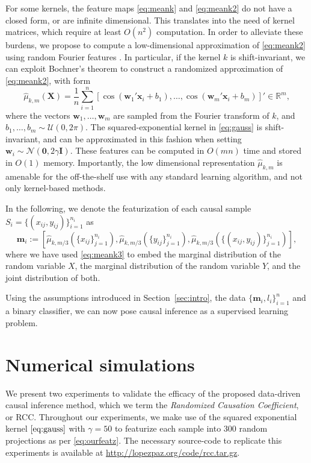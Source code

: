 \documentclass[twoside,11pt,a4paper]{article}
\begin{document}
For some kernels, the feature maps \eqref{eq:meank} and \eqref{eq:meank2} do
not have a closed form, or are infinite dimensional. This translates into the
need of kernel matrices, which require at least $O(n^2)$ computation. In order
to alleviate these burdens, we propose to compute a low-dimensional
approximation of \eqref{eq:meank2} using random Fourier features
\citep{Rahimi07}. In particular, if the kernel $k$ is shift-invariant, we can
exploit Bochner's theorem \citep{Rudin62} to construct a randomized
approximation of \eqref{eq:meank2}, with form
\begin{equation}\label{eq:meank3}
  \hat{\mu}_{k,m}(\bm X) = \frac{1}{n} \sum_{i=1}^n \left[ \cos(\bm w_1' \bm
  x_i + b_1), \ldots, \cos(\bm w_m' \bm x_i + b_m)\right]' \in
  \mathbb{R}^m,
\end{equation}
where the vectors $\bm w_1, \ldots, \bm w_m$ are sampled from the Fourier
transform of $k$, and $b_1, \ldots, b_m \sim \mathcal{U}(0, 2\pi)$. The
squared-exponential kernel in \eqref{eq:gauss} is shift-invariant, and can be
approximated in this fashion when setting $\bm w_i \sim \mathcal{N}(\bm 0,
2\gamma \bm I)$.  These features can be computed in $O(mn)$ time and stored in
$O(1)$ memory. Importantly, the low dimensional representation
$\hat{\mu}_{k,m}$ is amenable for the off-the-shelf use with any standard
learning algorithm, and not only kernel-based methods.

In the following, we denote the featurization of each causal sample $S_i =
\{(x_{ij},y_{ij})\}_{i=1}^{n_i}$ as 
\begin{equation}
  \label{eq:ourfeatz}
  \bm m_i :=
  \left[
  \hat{\mu}_{k,m/3}\left(\{x_{ij}\}_{j=1}^{n_i}\right),
  \hat{\mu}_{k,m/3}\left(\{y_{ij}\}_{j=1}^{n_i}\right),
  \hat{\mu}_{k,m/3}\left(\{(x_{ij},y_{ij})\}_{j=1}^{n_i}\right)
  \right],
\end{equation}
where we have used \eqref{eq:meank3} to embed the marginal distribution of the
random variable $X$, the marginal distribution of the random variable $Y$, and
the joint distribution of both.

Using the assumptions introduced in Section~\ref{sec:intro}, the data $\{\bm
m_i,l_i\}_{i=1}^n$ and a binary classifier, we can now pose causal inference as
a supervised learning problem.

\section{Numerical simulations}\label{sec:exps}
We present two experiments to validate the efficacy of the proposed data-driven
causal inference method, which we term the \emph{Randomized Causation
Coefficient}, or RCC. Throughout our experiments, we make use of the squared
exponential kernel $\eqref{eq:gauss}$ with $\gamma = 50$ to featurize each
sample into $300$ random projections as per \eqref{eq:ourfeatz}. The necessary
source-code to replicate this experiments is available at
\url{http://lopezpaz.org/code/rcc.tar.gz}.
\end{document}
